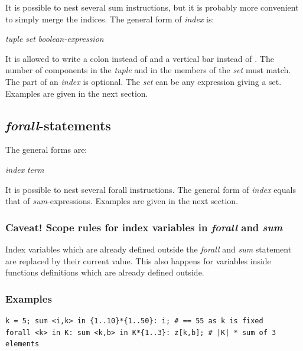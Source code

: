 \smallskip
\noindent It is possible to nest several sum instructions, but it is
probably more convenient to simply merge the indices.
The general form of \emph{index} is:

\smallskip
\emph{tuple}  \emph{set}  \emph{boolean-expression}

\smallskip
\noindent It is allowed to write a colon \code{:} instead of  and a
vertical bar \code{|} instead of .
The number of components in the \emph{tuple} and in the
members of the \emph{set} must match. The  part of an \emph{index} is
optional. The \emph{set} can be any expression giving a set. Examples
are given in the next section.

\subsection{\emph{forall}-statements}
The general forms are:

\smallskip
{} \emph{index}  \emph{term}

\smallskip
\noindent It is possible to nest several forall instructions.
The general form of \emph{index} equals that of
\emph{sum}-expressions.  Examples are given in the next section.

\subsubsection{Caveat! Scope rules for index variables
in \emph{forall} and \emph{sum}}
Index variables which are already defined outside the \emph{forall}
and \emph{sum} statement are replaced by their current value. This
also happens for variables inside functions definitions which are
already defined outside.

\subsubsection{Examples}
{\small
\begin{verbatim}
k = 5; sum <i,k> in {1..10}*{1..50}: i; # == 55 as k is fixed
forall <k> in K: sum <k,b> in K*{1..3}: z[k,b]; # |K| * sum of 3 elements
\end{verbatim}
}

